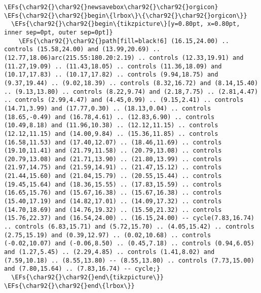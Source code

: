 \documentclass{article}
\newcommand{\EFs}[1]{\textcolor{EFs}{#1}} %
\begin{document}
\begin{Code}
\begin{Verbatim}
\EFs{\char92{}\char92{}newsavebox\char92{}\char92{}orgicon}
\EFs{\char92{}\char92{}begin\{lrbox\}\{\char92{}\char92{}orgicon\}}
  \EFs{\char92{}\char92{}begin\{tikzpicture\}[y=0.80pt, x=0.80pt, inner sep=0pt, outer sep=0pt]}
    \EFs{\char92{}\char92{}path[fill=black!6] (16.15,24.00) .. controls (15.58,24.00) and (13.99,20.69) .. (12.77,18.06)arc(215.55:180.20:2.19) .. controls (12.33,19.91) and (11.27,19.09) .. (11.43,18.05) .. controls (11.36,18.09) and (10.17,17.83) .. (10.17,17.82) .. controls (9.94,18.75) and (9.37,19.44) .. (9.02,18.39) .. controls (8.32,16.72) and (8.14,15.40) .. (9.13,13.80) .. controls (8.22,9.74) and (2.18,7.75) .. (2.81,4.47) .. controls (2.99,4.47) and (4.45,0.99) .. (9.15,2.41) .. controls (14.71,3.99) and (17.77,0.30) .. (18.13,0.04) .. controls (18.65,-0.49) and (16.78,4.61) .. (12.83,6.90) .. controls (10.49,8.18) and (11.96,10.38) .. (12.12,11.15) .. controls (12.12,11.15) and (14.00,9.84) .. (15.36,11.85) .. controls (16.58,11.53) and (17.40,12.07) .. (18.46,11.69) .. controls (19.10,11.41) and (21.79,11.58) .. (20.79,13.08) .. controls (20.79,13.08) and (21.71,13.90) .. (21.80,13.99) .. controls (21.97,14.75) and (21.59,14.91) .. (21.47,15.12) .. controls (21.44,15.60) and (21.04,15.79) .. (20.55,15.44) .. controls (19.45,15.64) and (18.36,15.55) .. (17.83,15.59) .. controls (16.65,15.76) and (15.67,16.38) .. (15.67,16.38) .. controls (15.40,17.19) and (14.82,17.01) .. (14.09,17.32) .. controls (14.70,18.69) and (14.76,19.32) .. (15.50,21.32) .. controls (15.76,22.37) and (16.54,24.00) .. (16.15,24.00) -- cycle(7.83,16.74) .. controls (6.83,15.71) and (5.72,15.70) .. (4.05,15.42) .. controls (2.75,15.19) and (0.39,12.97) .. (0.02,10.68) .. controls (-0.02,10.07) and (-0.06,8.50) .. (0.45,7.18) .. controls (0.94,6.05) and (1.27,5.45) .. (2.29,4.85) .. controls (1.41,8.02) and (7.59,10.18) .. (8.55,13.80) -- (8.55,13.80) .. controls (7.73,15.00) and (7.80,15.64) .. (7.83,16.74) -- cycle;}
  \EFs{\char92{}\char92{}end\{tikzpicture\}}
\EFs{\char92{}\char92{}end\{lrbox\}}


\end{Verbatim}
\end{Code}
\end{document}
